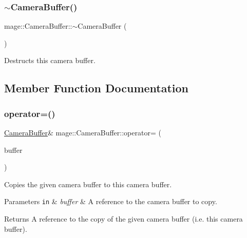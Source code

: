\subsubsection{\texorpdfstring{$\sim$\+Camera\+Buffer()}{~CameraBuffer()}}
{\footnotesize\ttfamily mage\+::\+Camera\+Buffer\+::$\sim$\+Camera\+Buffer (\begin{DoxyParamCaption}{ }\end{DoxyParamCaption})\hspace{0.3cm}{\ttfamily [default]}}

Destructs this camera buffer. 

\subsection{Member Function Documentation}
\hypertarget{structmage_1_1_camera_buffer_a4c2f048e1c441ae147455722d9cd4af7}{}\label{structmage_1_1_camera_buffer_a4c2f048e1c441ae147455722d9cd4af7} 
\subsubsection{\texorpdfstring{operator=()}{operator=()}\hspace{0.1cm}{\footnotesize\ttfamily [1/2]}}
{\footnotesize\ttfamily \hyperlink{structmage_1_1_camera_buffer}{Camera\+Buffer}\& mage\+::\+Camera\+Buffer\+::operator= (\begin{DoxyParamCaption}\item[{const \hyperlink{structmage_1_1_camera_buffer}{Camera\+Buffer} \&}]{buffer }\end{DoxyParamCaption})\hspace{0.3cm}{\ttfamily [default]}}

Copies the given camera buffer to this camera buffer.


\begin{DoxyParams}[1]{Parameters}
\mbox{\tt in}  & {\em buffer} & A reference to the camera buffer to copy. \\
\hline
\end{DoxyParams}
\begin{DoxyReturn}{Returns}
A reference to the copy of the given camera buffer (i.\+e. this camera buffer). 
\end{DoxyReturn}
\hypertarget{structmage_1_1_camera_buffer_a901081932ab76c9bdfacb0814e821190}{}\label{structmage_1_1_camera_buffer_a901081932ab76c9bdfacb0814e821190} 
